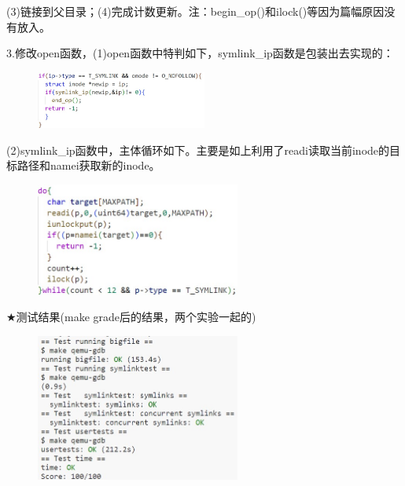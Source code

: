 \documentclass[12pt]{article}
\begin{document}
(3)链接到父目录；(4)完成计数更新。注：begin\_op()和ilock()等因为篇幅原因没有放入。
\newpage
\begin{figure}[!h]
    \centering
    \hfill
\end{figure}\par
3.修改open函数，(1)open函数中特判如下，symlink\_ip函数是包装出去实现的：
\begin{figure}[H]
    \centering
    \includegraphics[width=0.5\textwidth]{lab6-8.jpg}
\end{figure}\par
(2)symlink\_ip函数中，主体循环如下。主要是如上利用了readi读取当前inode的目标路径和namei获取新的inode。
\begin{figure}[H]
    \centering
    \includegraphics[width=0.6\textwidth]{lab6-10.jpg}
\end{figure}
\begin{large}
    \noindent $\bigstar $测试结果(make grade后的结果，两个实验一起的)
\end{large}
\begin{figure}[H]
    \centering
    \includegraphics[width=0.6\textwidth]{lab6-9.jpg}
\end{figure}
\end{document}
